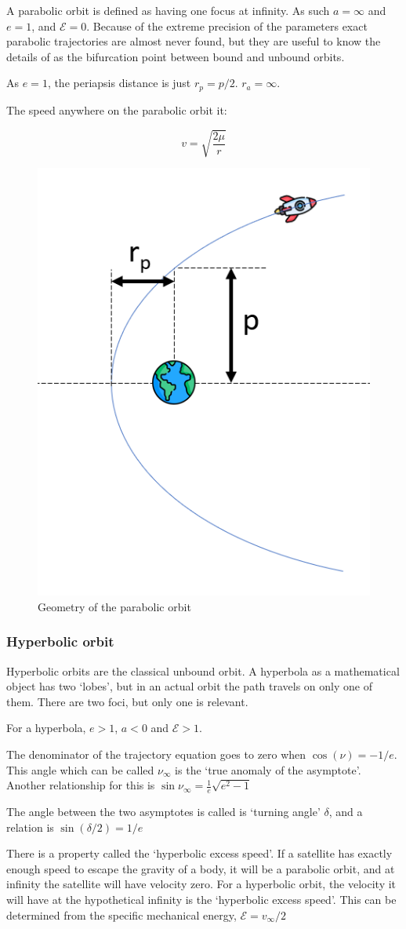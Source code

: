 \documentclass{report}
\begin{document}
A parabolic orbit is defined as having one focus at infinity. As such $a = \infty$ and $e=1$, and $\mathcal{E} = 0$. Because of the extreme precision of the parameters exact parabolic trajectories are almost never found, but they are useful to know the details of as the bifurcation point between bound and unbound orbits.

As $e=1$, the periapsis distance is just $r_p = p/2$. $r_a = \infty$.

The speed anywhere on the parabolic orbit it:

$$
v = \sqrt{\frac{2\mu}{r}}
$$

\begin{figure}[H]
    \centering
    \includegraphics[width=0.3\linewidth]{Latex Images/ParabolicOrbit.png}
    \caption{Geometry of the parabolic orbit}
    \label{fig:parabolicorbit}
\end{figure}

\subsubsection{Hyperbolic orbit}
Hyperbolic orbits are the classical unbound orbit. A hyperbola as a mathematical object has two `lobes', but in an actual orbit the path travels on only one of them. There are two foci, but only one is relevant.

For a hyperbola, $e>1$, $a<0$ and $\mathcal{E}>1$. 

The denominator of the trajectory equation goes to zero when $\cos{(\nu)} = -1/e$. This angle which can be called $\nu_{\infty}$ is the `true anomaly of the asymptote'. Another relationship for this is $\sin \nu _{\infty }={\frac {1}{e}}{\sqrt {e^{2}-1}}$

The angle between the two asymptotes is called is `turning angle' $\delta$, and a relation is $\sin{(\delta/2)}= 1/e$

There is a property called the `hyperbolic excess speed'. If a satellite has exactly enough speed to escape the gravity of a body, it will be a parabolic orbit, and at infinity the satellite will have velocity zero. For a hyperbolic orbit, the velocity it will have at the hypothetical infinity is the `hyperbolic excess speed'. This can be determined from the specific mechanical energy, $\mathcal{E} = v_{\infty}/2$
\end{document}
